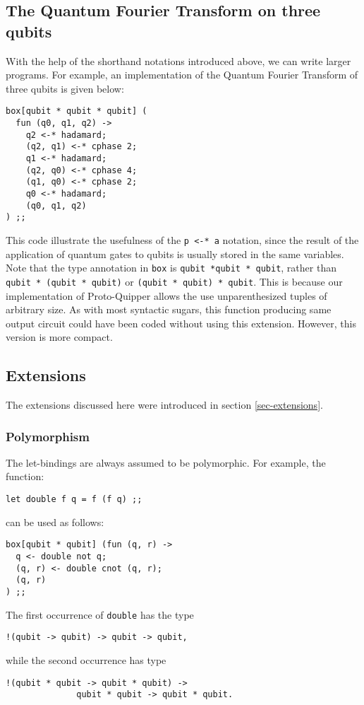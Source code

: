 \subsection{The Quantum Fourier Transform on three qubits}

With the help of the shorthand notations introduced above, we can write 
larger programs. For example, an implementation of the Quantum Fourier 
Transform of three qubits is given below:
\begin{verbatim}
box[qubit * qubit * qubit] (
  fun (q0, q1, q2) ->
    q2 <-* hadamard;
    (q2, q1) <-* cphase 2;
    q1 <-* hadamard;
    (q2, q0) <-* cphase 4;
    (q1, q0) <-* cphase 2;
    q0 <-* hadamard;
    (q0, q1, q2)
) ;;
\end{verbatim}
This code illustrate the usefulness of the \verb#p <-* a# notation, since 
the result of the application of quantum gates to qubits is usually stored 
in the same variables. Note that the type annotation in \verb#box# is 
\verb#qubit *qubit * qubit#, rather than \verb#qubit * (qubit * qubit)# or 
\verb#(qubit * qubit) * qubit#. This is because our implementation of 
Proto-Quipper allows the use unparenthesized tuples of arbitrary size. As 
with most syntactic sugars, this function producing same output circuit 
could have been coded without using this extension. However, this version 
is more compact. 

\subsection{Extensions}

The extensions discussed here were introduced in section 
\hyperref[sec-extensions]{\ref*{sec-extensions}}. 

\subsubsection{Polymorphism}

The let-bindings are always assumed to be polymorphic. For example, the 
function:
\begin{verbatim}
let double f q = f (f q) ;;
\end{verbatim}
can be used as follows:
\begin{verbatim}
box[qubit * qubit] (fun (q, r) ->
  q <- double not q;
  (q, r) <- double cnot (q, r);
  (q, r)
) ;;
\end{verbatim}
The first occurrence of \verb#double# has the type 
\begin{verbatim}
!(qubit -> qubit) -> qubit -> qubit,
\end{verbatim}
while the second occurrence has type 
\begin{verbatim}
!(qubit * qubit -> qubit * qubit) -> 
              qubit * qubit -> qubit * qubit.
\end{verbatim}

